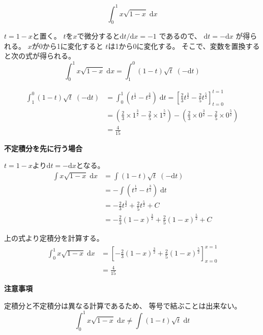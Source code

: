 \documentclass[12pt,b5paper]{ltjsarticle}
\begin{document}
\begin{equation}
 \int_{0}^{1} x\sqrt{1-x} \; \mathrm{d}x
\end{equation}

\hrulefill


$t=1-x$と置く。
$t$を$x$で微分すると$\mathrm{d}t/\mathrm{d}x=-1$
であるので、
$\mathrm{d}t=-\mathrm{d}x$
が得られる。
$x$が0から1に変化すると
$t$は1から0に変化する。
そこで、変数を置換すると次の式が得られる。
\begin{equation}
 \int_{0}^{1} x\sqrt{1-x} \; \mathrm{d}x
  =
  \int_{1}^{0} (1-t)\sqrt{t} \; (-\mathrm{d}t)
\end{equation}


\begin{align}
 \int_{1}^{0} (1-t)\sqrt{t} \; (-\mathrm{d}t)
  &=
  \int_{0}^{1} (t^{\frac{1}{2}}-t^{\frac{3}{2}}) \; \mathrm{d}t
  =
 \left[ \frac{2}{3}t^{\frac{3}{2}} - \frac{2}{5}t^{\frac{5}{2}}\right]_{t=0}^{t=1}\\
 &=
 \left( \frac{2}{3}\times 1^{\frac{3}{2}} - \frac{2}{5}\times 1^{\frac{5}{2}} \right)
 - \left( \frac{2}{3}\times 0^{\frac{3}{2}} - \frac{2}{5}\times 0^{\frac{5}{2}} \right)\\
 &= \frac{4}{15}
\end{align}

\dotfill

\textbf{不定積分を先に行う場合}

$t=1-x$より$\mathrm{d}t=-\mathrm{d}x$となる。
\begin{align}
 \int x\sqrt{1-x} \; \mathrm{d}x
  &= \int (1-t)\sqrt{t} \; (-\mathrm{d}t)\\
  &= -\int (t^{\frac{1}{2}}-t^{\frac{3}{2}}) \; \mathrm{d}t\\
  &= -\frac{2}{3}t^{\frac{3}{2}} + \frac{2}{5}t^{\frac{5}{2}} + C\\
  &= -\frac{2}{3}(1-x)^{\frac{3}{2}} + \frac{2}{5}(1-x)^{\frac{5}{2}} + C
\end{align}

上の式より定積分を計算する。
\begin{align}
 \int_{0}^{1} x\sqrt{1-x} \; \mathrm{d}x
  &= \left[ -\frac{2}{3}(1-x)^{\frac{3}{2}} + \frac{2}{5}(1-x)^{\frac{5}{2}} \right]_{x=0}^{x=1}\\
 &= \frac{4}{15}
\end{align}


\hrulefill


\textbf{注意事項}

定積分と不定積分は異なる計算であるため、
等号で結ぶことは出来ない。
\begin{equation}
 \int_{0}^{1} x\sqrt{1-x} \; \mathrm{d}x
  \ne
  \int (1-t)\sqrt{t} \; \mathrm{d}t
\end{equation}
\end{document}
